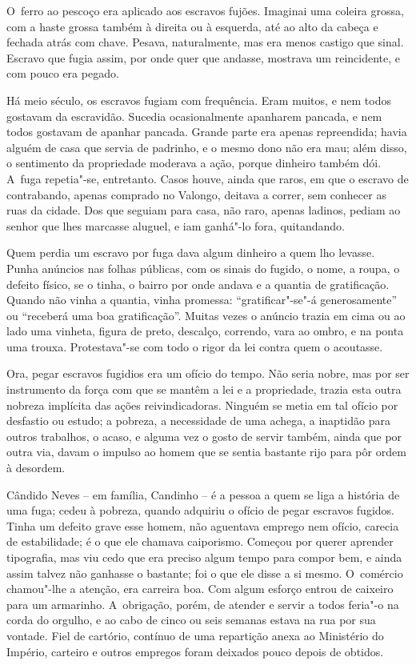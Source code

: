 O~ferro ao pescoço era aplicado aos escravos fujões. Imaginai uma
coleira grossa, com a haste grossa também à direita ou à esquerda, até
ao alto da cabeça e fechada atrás com chave. Pesava, naturalmente, mas
era menos castigo que sinal. Escravo que fugia assim, por onde quer que
andasse, mostrava um reincidente, e com pouco era pegado.

Há meio século, os escravos fugiam com frequência. Eram muitos, e nem
todos gostavam da escravidão. Sucedia ocasionalmente apanharem pancada,
e nem todos gostavam de apanhar pancada. Grande parte era apenas
repreendida; havia alguém de casa que servia de padrinho, e o mesmo dono
não era mau; além disso, o sentimento da propriedade moderava a ação,
porque dinheiro também dói. A~fuga repetia"-se, entretanto. Casos houve,
ainda que raros, em que o escravo de contrabando, apenas comprado no
Valongo, deitava a correr, sem conhecer as ruas da cidade. Dos que
seguiam para casa, não raro, apenas ladinos, pediam ao senhor que lhes
marcasse aluguel, e iam ganhá"-lo fora, quitandando.

Quem perdia um escravo por fuga dava algum dinheiro a quem lho levasse.
Punha anúncios nas folhas públicas, com os sinais do fugido, o nome, a
roupa, o defeito físico, se o tinha, o bairro por onde andava e a
quantia de gratificação. Quando não vinha a quantia, vinha promessa:
``gratificar"-se"-á generosamente'' ou ``receberá uma boa gratificação''.
Muitas vezes o anúncio trazia em cima ou ao lado uma vinheta, figura de
preto, descalço, correndo, vara ao ombro, e na ponta uma trouxa.
Protestava"-se com todo o rigor da lei contra quem o acoutasse.

Ora, pegar escravos fugidios era um ofício do tempo. Não seria nobre,
mas por ser instrumento da força com que se mantêm a lei e a
propriedade, trazia esta outra nobreza implícita das ações
reivindicadoras. Ninguém se metia em tal ofício por desfastio ou estudo;
a pobreza, a necessidade de uma achega, a inaptidão para outros
trabalhos, o acaso, e alguma vez o gosto de servir também, ainda que por
outra via, davam o impulso ao homem que se sentia bastante rijo para pôr
ordem à desordem.

Cândido Neves -- em família, Candinho -- é a pessoa a quem se liga a
história de uma fuga; cedeu à pobreza, quando adquiriu o ofício de pegar
escravos fugidos. Tinha um defeito grave esse homem, não aguentava
emprego nem ofício, carecia de estabilidade; é o que ele chamava
caiporismo. Começou por querer aprender tipografia, mas viu cedo que era
preciso algum tempo para compor bem, e ainda assim talvez não ganhasse o
bastante; foi o que ele disse a si mesmo. O~comércio chamou"-lhe a
atenção, era carreira boa. Com algum esforço entrou de caixeiro para um
armarinho. A~obrigação, porém, de atender e servir a todos feria"-o na
corda do orgulho, e ao cabo de cinco ou seis semanas estava na rua por
sua vontade. Fiel de cartório, contínuo de uma repartição anexa ao
Ministério do Império, carteiro e outros empregos foram deixados pouco
depois de obtidos.

